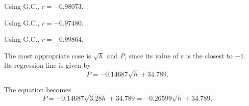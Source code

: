 \begin{solution}
    \begin{ppart}
        \begin{figure}[H]
            \centering
        \end{figure}
    \end{ppart}
    \begin{ppart}
        \begin{psubpart}
            Using G.C., $r = -0.98073$.
        \end{psubpart}
        \begin{psubpart}
            Using G.C., $r = -0.97480$.
        \end{psubpart}
        \begin{psubpart}
            Using G.C., $r = -0.99864$.
        \end{psubpart}
    \end{ppart}
    \begin{ppart}
        The most appropriate case is $\sqrt{h}$ and $P$, since its value of $r$ is the closest to $-1$. Its regression line is given by \[P = -0.14687\sqrt{h} + 34.789.\]
    \end{ppart}
    \begin{ppart}
        The equation becomes \[P = -0.14687\sqrt{3.28 h} + 34.789 = -0.26599 \sqrt{h} + 34.789.\]
    \end{ppart}
\end{solution}

